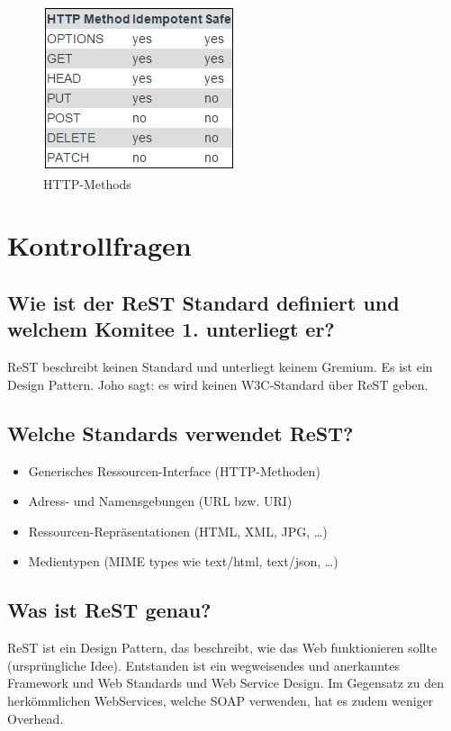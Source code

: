 \begin{figure}[h!]
\centering
\includegraphics[width=0.5\linewidth]{fig/rest-methods}
\caption{HTTP-Methods}
\label{fig:rest-methods}
\end{figure}


\section{Kontrollfragen}

\subsection{Wie ist der ReST Standard definiert und welchem Komitee 1. unterliegt er?}
ReST beschreibt keinen Standard und unterliegt keinem Gremium. Es ist ein Design Pattern. Joho sagt: es wird keinen W3C-Standard über ReST geben.

\subsection{Welche Standards verwendet ReST?}
\begin{itemize}
	\item Generisches Ressourcen-Interface (HTTP-Methoden)
	\item Adress- und Namensgebungen (URL bzw. URI)
	\item Ressourcen-Repräsentationen (HTML, XML, JPG, …)
	\item Medientypen (MIME types wie text/html, text/json, …)
\end{itemize}

\subsection{Was ist ReST genau?}
ReST ist ein Design Pattern, das beschreibt, wie das Web funktionieren sollte (ursprüngliche Idee). Entstanden ist ein wegweisendes und anerkanntes Framework und Web Standards und Web Service Design. Im Gegensatz zu den herkömmlichen WebServices, welche SOAP verwenden, hat es zudem weniger Overhead.

